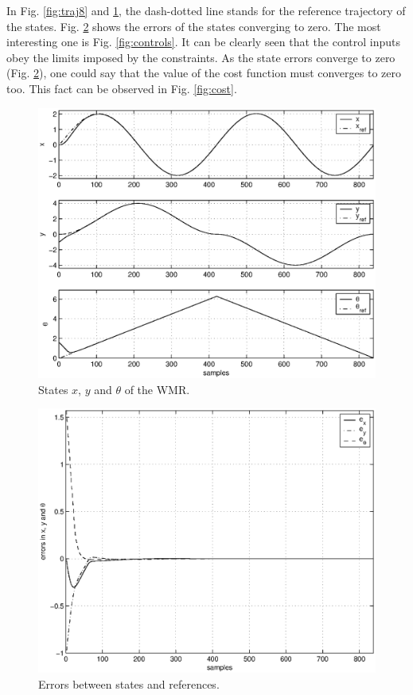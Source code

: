 \documentclass[twocolumn]{IEEEtran} %
\begin{document}
In Fig. \ref{fig:traj8} and \ref{fig:states}, the dash-dotted line stands for the reference trajectory of the states. Fig. \ref{fig:errors} shows the errors of the states converging to zero. The most interesting one is Fig. \ref{fig:controls}. It can be clearly seen that the control inputs obey the limits imposed by the constraints. As the state errors converge to zero (Fig. \ref{fig:errors}), one could say that the value of the cost function must converges to zero too. This fact can be observed in Fig. \ref{fig:cost}.
\begin{figure}\begin{center}
    \includegraphics[width=.95\linewidth]{Figures/states.eps}
    \caption{States $x$, $y$ and $\theta$ of the WMR.}
    \label{fig:states}
\end{center}\end{figure}
\begin{figure}\begin{center}
    \includegraphics[width=.95\linewidth]{Figures/errors.eps}
    \caption{Errors between states and references.}
    \label{fig:errors}
\end{center}\end{figure}
\end{document}
